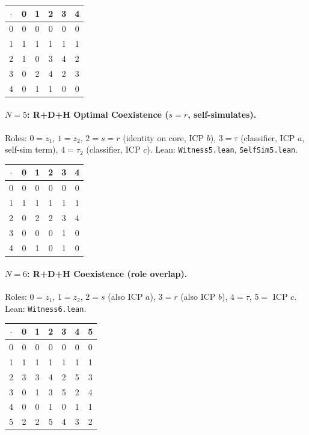 \documentclass[sigconf,screen,review,anonymous]{acmart}
\newcommand{\dotop}{\cdot}
\theoremstyle{remark}
\begin{document}
\medskip
{\small
\begin{tabular}{c|ccccc}
$\dotop$ & 0 & 1 & 2 & 3 & 4 \\\hline
0 & 0 & 0 & 0 & 0 & 0 \\
1 & 1 & 1 & 1 & 1 & 1 \\
2 & 1 & 0 & 3 & 4 & 2 \\
3 & 0 & 2 & 4 & 2 & 3 \\
4 & 0 & 1 & 1 & 0 & 0 \\
\end{tabular}}

\paragraph{$N\!=\!5$: R+D+H Optimal Coexistence ($s = r$, self-simulates).}
Roles: $0 = z_1$, $1 = z_2$, $2 = s = r$ (identity on core, ICP $b$), $3 = \tau$ (classifier, ICP $a$, self-sim term), $4 = \tau_2$ (classifier, ICP $c$). \quad Lean: \texttt{Witness5.lean}, \texttt{SelfSim5.lean}.

\medskip
{\small
\begin{tabular}{c|ccccc}
$\dotop$ & 0 & 1 & 2 & 3 & 4 \\\hline
0 & 0 & 0 & 0 & 0 & 0 \\
1 & 1 & 1 & 1 & 1 & 1 \\
2 & 0 & 2 & 2 & 3 & 4 \\
3 & 0 & 0 & 0 & 1 & 0 \\
4 & 0 & 1 & 0 & 1 & 0 \\
\end{tabular}}

\paragraph{$N\!=\!6$: R+D+H Coexistence (role overlap).}
Roles: $0 = z_1$, $1 = z_2$, $2 = s$ (also ICP $a$), $3 = r$ (also ICP $b$), $4 = \tau$, $5 =$ ICP $c$. \quad Lean: \texttt{Witness6.lean}.

\medskip
{\small
\begin{tabular}{c|cccccc}
$\dotop$ & 0 & 1 & 2 & 3 & 4 & 5 \\\hline
0 & 0 & 0 & 0 & 0 & 0 & 0 \\
1 & 1 & 1 & 1 & 1 & 1 & 1 \\
2 & 3 & 3 & 4 & 2 & 5 & 3 \\
3 & 0 & 1 & 3 & 5 & 2 & 4 \\
4 & 0 & 0 & 1 & 0 & 1 & 1 \\
5 & 2 & 2 & 5 & 4 & 3 & 2 \\
\end{tabular}}
\end{document}
